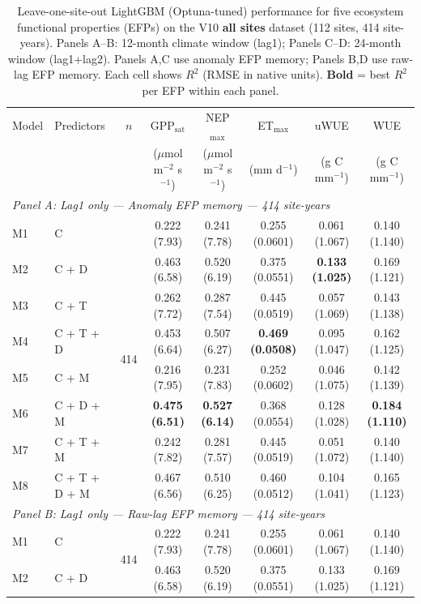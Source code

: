 \begin{table}[htbp]
\centering
\caption{Leave-one-site-out LightGBM (Optuna-tuned) performance for five ecosystem functional properties (EFPs) on the V10 \textbf{all sites} dataset (112 sites, 414 site-years). Panels A--B: 12-month climate window (lag1); Panels C--D: 24-month window (lag1+lag2). Panels A,C use anomaly EFP memory; Panels B,D use raw-lag EFP memory. Each cell shows $R^2$ (RMSE in native units). \textbf{Bold} = best $R^2$ per EFP within each panel.}
\label{tab:LGBoptuna_LOSO_v10_all_sites}
\footnotesize
\setlength{\tabcolsep}{4pt}
\begin{tabular}{llcccccc}
\toprule
Model & Predictors & $n$ & GPP$_\mathrm{sat}$ & NEP$_\mathrm{max}$ & ET$_\mathrm{max}$ & uWUE & WUE \\
  &  &  & ($\mu$mol m$^{-2}$ s$^{-1}$) & ($\mu$mol m$^{-2}$ s$^{-1}$) & (mm d$^{-1}$) & (g C mm$^{-1}$) & (g C mm$^{-1}$) \\
\midrule
\multicolumn{8}{l}{\textit{Panel A: Lag1 only --- Anomaly EFP memory --- 414 site-years}} \\
\midrule
M1 & C & \multirow{8}{*}{414} & 0.222 (7.93) & 0.241 (7.78) & 0.255 (0.0601) & 0.061 (1.067) & 0.140 (1.140) \\
M2 & C + D &  & 0.463 (6.58) & 0.520 (6.19) & 0.375 (0.0551) & \textbf{0.133 (1.025)} & 0.169 (1.121) \\
M3 & C + T &  & 0.262 (7.72) & 0.287 (7.54) & 0.445 (0.0519) & 0.057 (1.069) & 0.143 (1.138) \\
M4 & C + T + D &  & 0.453 (6.64) & 0.507 (6.27) & \textbf{0.469 (0.0508)} & 0.095 (1.047) & 0.162 (1.125) \\
M5 & C + M &  & 0.216 (7.95) & 0.231 (7.83) & 0.252 (0.0602) & 0.046 (1.075) & 0.142 (1.139) \\
M6 & C + D + M &  & \textbf{0.475 (6.51)} & \textbf{0.527 (6.14)} & 0.368 (0.0554) & 0.128 (1.028) & \textbf{0.184 (1.110)} \\
M7 & C + T + M &  & 0.242 (7.82) & 0.281 (7.57) & 0.445 (0.0519) & 0.051 (1.072) & 0.140 (1.140) \\
M8 & C + T + D + M &  & 0.467 (6.56) & 0.510 (6.25) & 0.460 (0.0512) & 0.104 (1.041) & 0.165 (1.123) \\
\midrule
\multicolumn{8}{l}{\textit{Panel B: Lag1 only --- Raw-lag EFP memory --- 414 site-years}} \\
\midrule
M1 & C & \multirow{8}{*}{414} & 0.222 (7.93) & 0.241 (7.78) & 0.255 (0.0601) & 0.061 (1.067) & 0.140 (1.140) \\
M2 & C + D &  & 0.463 (6.58) & 0.520 (6.19) & 0.375 (0.0551) & 0.133 (1.025) & 0.169 (1.121) \\

\end{tabular}
\end{table}
